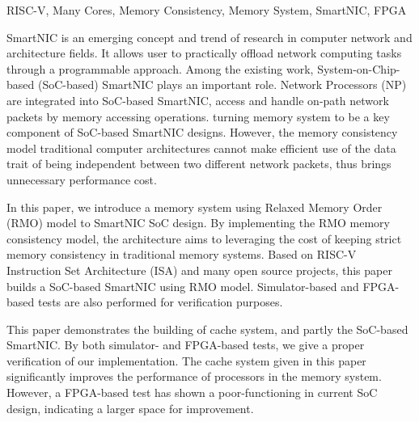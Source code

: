 \documentclass[supercite,gbt15cite,notofont]{HustGraduPaper}
\begin{document}
\begin{enabstract}{RISC-V, Many Cores, Memory Consistency, Memory System, SmartNIC, FPGA}

SmartNIC is an emerging concept and trend of research in computer network and
architecture fields. It allows user to practically offload network computing
tasks through a programmable approach. Among the existing work,
System-on-Chip-based (SoC-based) SmartNIC plays an important role. Network
Processors (NP) are integrated into SoC-based SmartNIC, access and handle
on-path network packets by memory accessing operations. turning memory system
to be a key component of SoC-based SmartNIC designs. However, the memory
consistency model traditional computer architectures cannot make efficient use
of the data trait of being independent between two different network packets,
thus brings unnecessary performance cost.

In this paper, we introduce a memory system using Relaxed Memory Order (RMO)
model to SmartNIC SoC design. By implementing the RMO memory consistency model,
the architecture aims to leveraging the cost of keeping strict memory
consistency in traditional memory systems. Based on RISC-V Instruction Set
Architecture (ISA) and many open source projects, this paper builds a SoC-based
SmartNIC using RMO model. Simulator-based and FPGA-based tests are also
performed for verification purposes.

This paper demonstrates the building of cache system, and partly the SoC-based
SmartNIC. By both simulator- and FPGA-based tests, we give a proper verification
of our implementation. The cache system given in this paper significantly
improves the performance of processors in the memory system. However, a
FPGA-based test has shown a poor-functioning in current SoC design, indicating
a larger space for improvement.

\end{enabstract}

\tableofcontents[level=2]

\clearpage








\end{document}
